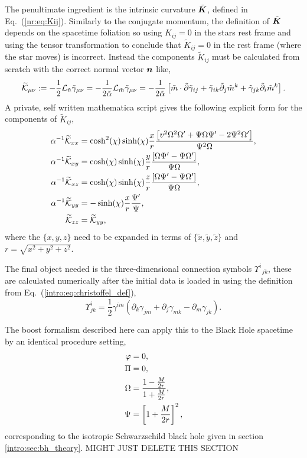 The penultimate ingredient is the intrinsic curvature $\tilde{\boldsymbol{K}}$, defined in Eq.~(\ref{nr:eq:Kij}). Similarly to the conjugate momentum, the definition of $\tilde{\boldsymbol{K}}$ depends on the spacetime foliation so using ${K}_{ij}=0$ in the stars rest frame and using the tensor transformation to conclude that $\tilde{K}_{ij}=0$ in the rest frame (where the star moves) is incorrect. Instead the components $\tilde{K}_{ij}$ must be calculated from scratch with the correct normal vector $\boldsymbol{n}$ like,
\begin{equation} \widetilde{\mathcal{K}}_{\mu\nu} := -\frac{1}{2}\mathcal{L}_{\tilde{n}}\tilde{\gamma}_{\mu\nu} =-\frac{1}{2\tilde{\alpha}}\mathcal{L}_{\tilde{m}}\tilde{\gamma}_{\mu\nu} = -\frac{1}{2\tilde{\alpha}}\left[ \tilde m \cdot \tilde{\partial}\tilde{\gamma}_{ij} +  \tilde{\gamma}_{ik}\tilde{\partial}_j \tilde{m}^k +\tilde{\gamma}_{jk}\tilde{\partial}_i \tilde{m}^k\right].\end{equation}
A private, self written mathematica script gives the following explicit form for the components of $\tilde{K}_{ij}$,
\begin{align}\alpha^{-1} \widetilde{\mathcal{K}}_{xx} &= \cosh^2(\chi)\sinh(\chi)\frac{x }{r}\frac{ \left[v^2 \Omega^2 \Omega'+\Psi \Omega \Psi'-2 \Psi^2 \Omega'\right]}{ \Psi^2 \Omega},\\
 \alpha^{-1} \widetilde{\mathcal{K}}_{xy} &= \cosh(\chi)\sinh(\chi)\frac{ y}{r}\frac{ \left[\Omega \Psi'- \Psi \Omega'\right]}{ \Psi \Omega },\\
 \alpha^{-1} \widetilde{\mathcal{K}}_{xz} &= \cosh(\chi)\sinh(\chi)\frac{ z}{r}\frac{  \left[\Omega \Psi'- \Psi \Omega'\right]}{ \Psi \Omega },\\
 \alpha^{-1} \widetilde{\mathcal{K}}_{yy} &= -\sinh(\chi)\frac{ x }{r}\frac{ \Psi'}{  \Psi },\\
\widetilde{\mathcal{K}}_{zz}&=\widetilde{\mathcal{K}}_{yy} ,\end{align}
where the $\{x,y,z\}$ need to be expanded in terms of $\{\tilde{x},  \tilde{y}, \tilde{z} \}$ and $r = \sqrt{x^2 + y^2 + z^2}$.

The final object needed is the three-dimensional connection symbols $\Upsilon^i_{\,\,\,jk}$, these are calculated numerically after the initial data is loaded in using the definition from Eq.~(\ref{intro:eq:christoffel_def}),
 \begin{equation}
\Upsilon^i_{jk} = \frac{1}{2}\gamma^{im}\left( \partial_k \gamma_{jm} +  \partial_j \gamma_{mk} -  \partial_m \gamma_{jk} \right).
 \end{equation}

 The boost formalism described here can apply this to the Black Hole spacetime by an identical procedure setting, 
\begin{align} 
\varphi&=0,\\
\Pi&=0,\\
\Omega &= \frac{1-\frac{M}{2r}}{1+\frac{M}{2r}}, \\
 \Psi &= \left[1+\frac{M}{2r}\right]^2,
 \end{align}
 corresponding to the isotropic Schwarzschild black hole given in section \ref{intro:sec:bh_theory}.
 \newpage
 MIGHT JUST DELETE THIS SECTION
 
